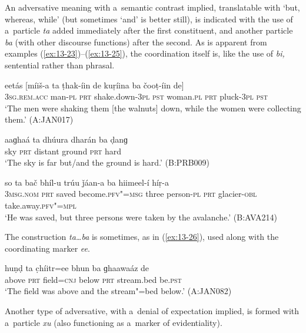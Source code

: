  An adversative meaning with a~semantic contrast implied, translatable with `but, whereas, while' (but sometimes `and' is better still), is indicated with the use of a~particle \textit{ta} added immediately after the first constituent, and another particle \textit{ba} (with other discourse functions) after the second. As is apparent from examples (\ref{ex:13-23})--(\ref{ex:13-25}), the coordination itself is, like the use of \textit{bi,} sentential rather than phrasal.

\begin{exe}
\ex
\label{ex:13-23}
\gll eetás [míiš-a ta ṭhak-íin de kuṛíina ba čooṭ-íin de] \\
\textsc{3sg.rem.acc} man-\textsc{pl} \textsc{prt} shake.down-\textsc{3pl} \textsc{pst} woman.\textsc{pl} \textsc{prt} pluck-\textsc{3pl} \textsc{pst} \\
\glt `The men were shaking them [the walnuts] down, while the women were collecting them.' (A:JAN017)

\ex
\label{ex:13-24}
\gll aaɡhaá ta dhúura dharán ba ḍanɡ  \\
sky \textsc{prt} distant ground \textsc{prt} hard \\
\glt `The sky is far but/and the ground is hard.' (B:PRB009)

\ex
\label{ex:13-25}
\gll so ta bač bhíl-u trúu ǰáan-a ba hiimeel-í híṛ-a \\
\textsc{3msg.nom} \textsc{prt} saved become.\textsc{pfv"=msg} three person-\textsc{pl} \textsc{prt } glacier-\textsc{obl} take.away.\textsc{pfv"=mpl}  \\
\glt `He was saved, but three persons were taken by the avalanche.' (B:AVA214) 
\end{exe}

The construction \textit{ta{\ldots}ba} is sometimes, as in (\ref{ex:13-26}), used along with the coordinating marker \textit{ee}.

\begin{exe}
\ex
\label{ex:13-26}
\gll huṇḍ ta c̣híitr=ee bhun ba ɡhaawaáz de \\
above \textsc{prt} field=\textsc{cnj} below \textsc{prt} stream.bed be.\textsc{pst} \\
\glt `The field was above and the stream"=bed below.' (A:JAN082) 
\end{exe}


 Another type of adversative, with a~denial of expectation implied, is formed with a~particle \textit{xu} (also functioning as a~marker of evidentiality).

